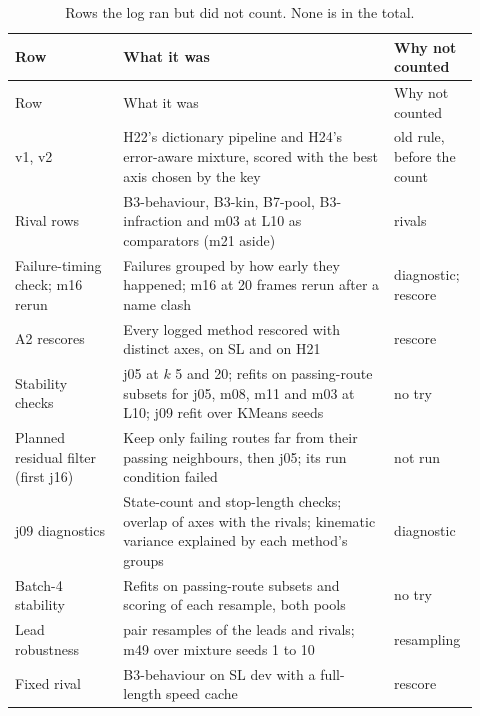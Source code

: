 {\small
\begin{longtable}{@{}>{\raggedright\arraybackslash}p{0.22\linewidth}
                   >{\raggedright\arraybackslash}p{0.55\linewidth}
                   >{\raggedright\arraybackslash}p{0.15\linewidth}@{}}
\caption{Rows the log ran but did not count. None is in the total.}\label{tab:nottried}\\
\toprule
Row & What it was & Why not counted \\
\midrule
\endfirsthead
\toprule
Row & What it was & Why not counted \\
\midrule
\endhead
\bottomrule
\endfoot
v1, v2 & H22's dictionary pipeline and H24's error-aware mixture, scored with the best axis chosen by the key & old rule, before the count \\
Rival rows & B3-behaviour, B3-kin, B7-pool, B3-infraction and m03 at L10 as comparators (m21 aside) & rivals \\
Failure-timing check; m16 rerun & Failures grouped by how early they happened; m16 at 20 frames rerun after a name clash & diagnostic; rescore \\
A2 rescores & Every logged method rescored with distinct axes, on SL and on H21 & rescore \\
Stability checks & j05 at $k$ 5 and 20; refits on passing-route subsets for j05, m08, m11 and m03 at L10; j09 refit over KMeans seeds & no try \\
Planned residual filter (first j16) & Keep only failing routes far from their passing neighbours, then j05; its run condition failed & not run \\
j09 diagnostics & State-count and stop-length checks; overlap of axes with the rivals; kinematic variance explained by each method's groups & diagnostic \\
Batch-4 stability & Refits on passing-route subsets and scoring of each resample, both pools & no try \\
Lead robustness & 30 pair resamples of the leads and rivals; m49 over mixture seeds 1 to 10 & resampling \\
Fixed rival & B3-behaviour on SL dev with a full-length speed cache & rescore \\

\end{longtable}}
